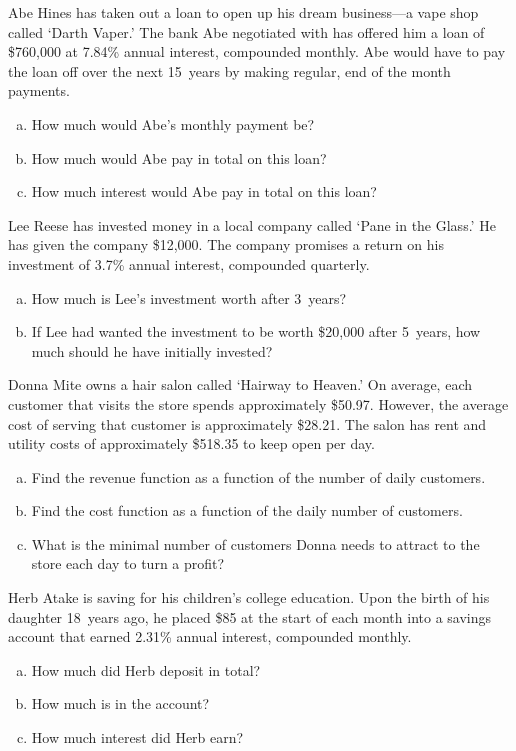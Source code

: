 \documentclass[12pt,letterpaper]{exam}
\begin{document}
\begin{questions}
\newpage
\question[10] Abe Hines has taken out a loan to open up his dream business---a vape shop called `Darth Vaper.' The bank Abe negotiated with has offered him a loan of \$760,000 at 7.84\% annual interest, compounded monthly. Abe would have to pay the loan off over the next 15~years by making regular, end of the month payments.
	\begin{enumerate}[(a)]
	\item How much would Abe's monthly payment be?
	\item How much would Abe pay in total on this loan?
	\item How much interest would Abe pay in total on this loan?
	\end{enumerate}



\newpage
\question[10] Lee Reese has invested money in a local company called `Pane in the Glass.' He has given the company \$12,000. The company promises a return on his investment of 3.7\% annual interest, compounded quarterly. 
	\begin{enumerate}[(a)]
	\item How much is Lee's investment worth after 3~years?
	\item If Lee had wanted the investment to be worth \$20,000 after 5~years, how much should he have initially invested? 
	\end{enumerate} 



\newpage
\question[10] Donna Mite owns a hair salon called `Hairway to Heaven.' On average, each customer that visits the store spends approximately \$50.97. However, the average cost of serving that customer is approximately \$28.21. The salon has rent and utility costs of approximately \$518.35 to keep open per day. 
	\begin{enumerate}[(a)]
	\item Find the revenue function as a function of the number of daily customers. 
	\item Find the cost function as a function of the daily number of customers. 
	\item What is the minimal number of customers Donna needs to attract to the store each day to turn a profit? 
	\end{enumerate} 



\newpage
\question[10] Herb Atake is saving for his children's college education. Upon the birth of his daughter 18~years ago, he placed \$85 at the start of each month into a savings account that earned 2.31\% annual interest, compounded monthly. 
	\begin{enumerate}[(a)]
	\item How much did Herb deposit in total?
	\item How much is in the account?
	\item How much interest did Herb earn?
	\end{enumerate} 




\end{questions}
\end{document}
